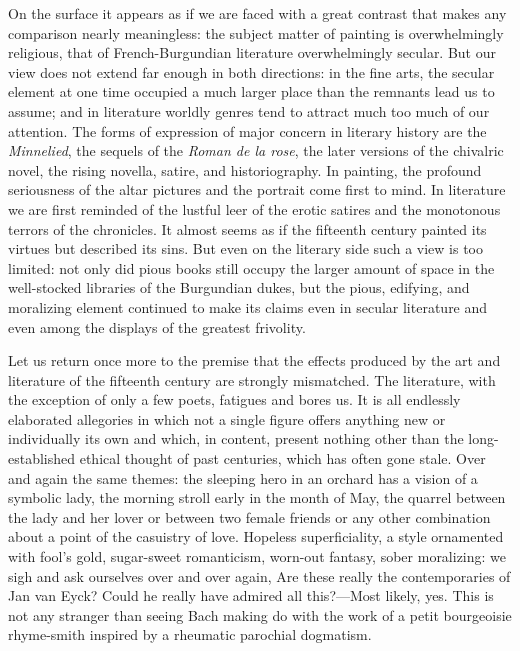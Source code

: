 On the surface it appears as if we are faced with a great contrast that
makes any comparison nearly meaningless: the subject matter of painting
is overwhelmingly religious, that of French-Burgundian literature
overwhelmingly secular. But our view does not extend far enough in both
directions: in the fine arts, the secular element at one time occupied a
much larger place than the remnants lead us to assume; and in literature
worldly genres tend to attract much too much of our attention. The forms
of expression of major concern in literary history are the
\emph{Minnelied}, the sequels of the \emph{Roman de la rose}, the later
versions of the chivalric novel, the rising novella, satire, and
historiography. In painting, the profound seriousness of the altar
pictures and the portrait come first to mind. In literature we are first
reminded of the lustful leer of the erotic satires and the monotonous
terrors of the chronicles. It almost seems as if the fifteenth century
painted its virtues but described its sins. But even on the literary
side such a view is too limited: not only did pious books still occupy
the larger amount of space in the well-stocked libraries of the
Burgundian dukes, but the pious, edifying, and moralizing element
continued to make its claims even in secular literature and even among
the displays of the greatest frivolity.

Let us return once more to the premise that the effects produced by the
art and literature of the fifteenth century are strongly mismatched. The
literature, with the exception of only a few poets, fatigues and bores
us. It is all endlessly elaborated allegories in which not a single
figure offers anything new or individually its own and which, in
content, present nothing other than the long-established ethical thought
of past centuries, which has often gone stale. Over and again the same
themes: the sleeping hero in an orchard has a vision of a symbolic lady,
the morning stroll early
\protect\hypertarget{21_Chapter_Thirteen__IMAGE_AND_WORD.xhtmlux5cux23page_333}{}{}in
the month of May, the quarrel between the lady and her lover or between
two female friends or any other combination about a point of the
casuistry of love. Hopeless superficiality, a style ornamented with
fool's gold, sugar-sweet romanticism, worn-out fantasy, sober
moralizing: we sigh and ask ourselves over and over again, Are these
really the contemporaries of Jan van Eyck? Could he really have admired
all this?---Most likely, yes. This is not any stranger than seeing Bach
making do with the work of a petit bourgeoisie rhyme-smith inspired by a
rheumatic parochial dogmatism.

